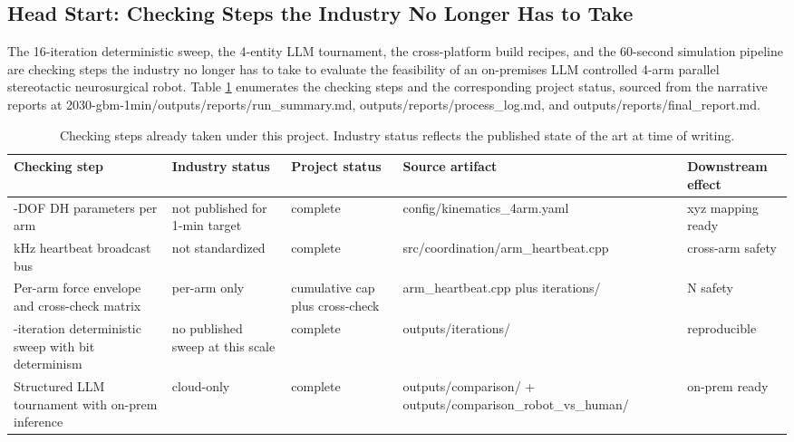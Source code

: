 \subsection{Head Start: Checking Steps the Industry No Longer Has to Take}
\label{sec:discussion-headstart}

The 16-iteration deterministic sweep, the 4-entity LLM tournament,
the cross-platform build recipes, and the 60-second simulation
pipeline are checking steps the industry no longer has to take to
evaluate the feasibility of an on-premises LLM controlled 4-arm
parallel stereotactic neurosurgical robot. Table \ref{tab:headstart}
enumerates the checking steps and the corresponding project status,
sourced from the narrative reports at
2030-gbm-1min/outputs/reports/run_summary.md,
outputs/reports/process_log.md, and outputs/reports/final_report.md.

\begin{table}[H]
\centering
\caption{Checking steps already taken under this project. Industry
status reflects the published state of the art at time of writing.}
\label{tab:headstart}
\begin{tabular}{>{\raggedright\arraybackslash}p{3.0cm}
                >{\raggedright\arraybackslash}p{2.6cm}
                >{\raggedright\arraybackslash}p{3.0cm}
                >{\raggedright\arraybackslash}p{3.2cm}
                >{\raggedright\arraybackslash}p{2.4cm}}
\toprule
\textbf{Checking step} & \textbf{Industry status} & \textbf{Project status} & \textbf{Source artifact} & \textbf{Downstream effect} \\
\midrule
7-DOF DH parameters per arm & not published for 1-min target & complete & config/kinematics_4arm.yaml & xyz mapping ready \\
1 kHz heartbeat broadcast bus & not standardized & complete & src/coordination/arm_heartbeat.cpp & cross-arm safety \\
Per-arm force envelope and cross-check matrix & per-arm only & cumulative cap plus cross-check & arm_heartbeat.cpp plus iterations/ & 12 N safety \\
16-iteration deterministic sweep with bit determinism & no published sweep at this scale & complete & outputs/iterations/ & reproducible \\
Structured LLM tournament with on-prem inference & cloud-only & complete & outputs/comparison/ + outputs/comparison_robot_vs_human/ & on-prem ready \\
\bottomrule
\end{tabular}
\end{table}


